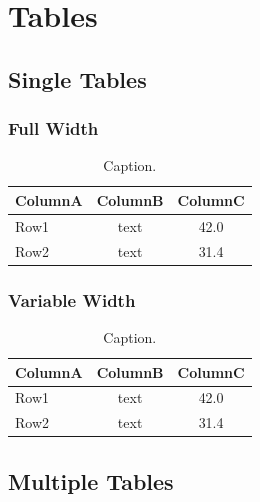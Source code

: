 
\chapter{Tables}
\label{ch:tables}



\section{Single Tables}
\label{sec:single-tables}


\subsection{Full Width}

\begin{table}[!ht]
  \small
  \centering
  \caption{Caption.}
  \label{tab:label}
  \begin{tabularx}{\textwidth}{X | c S[table-format=2.1]}
    \toprule
    \textbf{ColumnA} & \textbf{ColumnB} & {\textbf{ColumnC}} \\
    \midrule
    Row1 & text & 42.0 \\
    Row2 & text & 31.4 \\
    \bottomrule
  \end{tabularx}
\end{table}


\subsection{Variable Width}

\begin{table}[!ht]
  \small
  \centering
  \caption{Caption.}
  \label{tab:label}
  \begin{tabular}{l | c S[table-format=2.1]}
    \toprule
    \textbf{ColumnA} & \textbf{ColumnB} & {\textbf{ColumnC}} \\
    \midrule
    Row1 & text & 42.0 \\
    Row2 & text & 31.4 \\
    \bottomrule
  \end{tabular}
\end{table}



\section{Multiple Tables}
\label{sec:multiple-tables}


